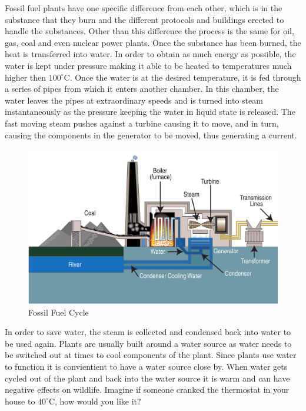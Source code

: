 \documentclass[msc,oneside]{ubcthesis}%
\begin{document}
Fossil fuel plants have one specific difference from each other, which is in the substance that they burn and the different protocols and buildings erected to handle the substances. Other than this difference the process is the same for oil, gas, coal and even nuclear power plants. Once the substance has been burned, the heat is transferred into water. In order to obtain as much energy as possible, the water is kept under pressure making it able to be heated to temperatures much higher then $100^\circ$C. Once the water is at the desired temperature, it is fed through a series of pipes from which it enters another chamber. In this chamber, the water leaves the pipes at extraordinary speeds and is turned into steam instantaneously as the pressure keeping the water in liquid state is released. The fast moving steam pushes against a turbine causing it to move, and in turn, causing the components in the generator to be moved, thus generating a current. 

 \begin{figure}[hbt] \label{FossilFuelCycle} 
    \begin{center}
      \includegraphics[width=1\textwidth]{fossil_fuel}
      \caption[Fossil Fuel Cycle]{Fossil Fuel Cycle \cite{Coal}}
    \end{center}
  \end{figure}

\newpage

In order to save water, the steam is collected and condensed back into water to be used again. Plants are 
usually built around a water source as water needs to be switched out at times to cool components of the plant. Since plants use water to function it is convientient to have a water source close by. When water gets cycled out of the plant and back into the water source it is warm and can have negative effects on wildlife. Imagine if someone cranked the thermostat in your house to $40^\circ$C, how would you like it?
\end{document}
